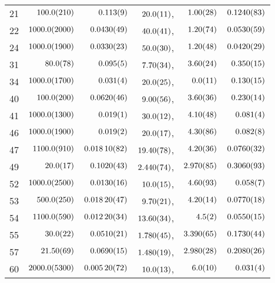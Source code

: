 \begin{tabular}{l|r|r|r|r|r}
21 & $\num{100+-21.0}$ & $\num{0.113+-0.009}$ & $\num{20+-1.1}$, & $\num{1.0+-0.28}$ & $\num{0.124+-0.0083}$ \\
22 & $\num{1000+-200.0}$ & $\num{0.043+-0.0049}$ & $\num{40+-4.1}$, & $\num{1.2+-0.74}$ & $\num{0.053+-0.0059}$ \\
24 & $\num{1000+-190.0}$ & $\num{0.033+-0.0023}$ & $\num{50+-3.0}$, & $\num{1.2+-0.48}$ & $\num{0.042+-0.0029}$ \\
31 & $\num{80+-7.8}$ & $\num{0.095+-0.005}$ & $\num{7.7+-0.34}$, & $\num{3.6+-0.24}$ & $\num{0.35+-0.015}$ \\
34 & $\num{1000+-170.0}$ & $\num{0.031+-0.004}$ & $\num{20+-2.5}$, & $\num{0+-1.1}$ & $\num{0.13+-0.015}$ \\
40 & $\num{100+-20.0}$ & $\num{0.062+-0.0046}$ & $\num{9.0+-0.56}$, & $\num{3.6+-0.36}$ & $\num{0.23+-0.014}$ \\
41 & $\num{1000+-130.0}$ & $\num{0.019+-0.001}$ & $\num{30+-1.2}$, & $\num{4.1+-0.48}$ & $\num{0.081+-0.004}$ \\
46 & $\num{1000+-190.0}$ & $\num{0.019+-0.002}$ & $\num{20+-1.7}$, & $\num{4.3+-0.86}$ & $\num{0.082+-0.008}$ \\
47 & $\num{1100+-91.0}$ & $\num{0.0181+-0.00082}$ & $\num{19.4+-0.78}$, & $\num{4.2+-0.36}$ & $\num{0.076+-0.0032}$ \\
49 & $\num{20+-1.7}$ & $\num{0.102+-0.0043}$ & $\num{2.44+-0.074}$, & $\num{2.97+-0.085}$ & $\num{0.306+-0.0093}$ \\
52 & $\num{1000+-250.0}$ & $\num{0.013+-0.0016}$ & $\num{10+-1.5}$, & $\num{4.6+-0.93}$ & $\num{0.058+-0.007}$ \\
53 & $\num{500+-25.0}$ & $\num{0.0182+-0.00047}$ & $\num{9.7+-0.21}$, & $\num{4.2+-0.14}$ & $\num{0.077+-0.0018}$ \\
54 & $\num{1100+-59.0}$ & $\num{0.0122+-0.00034}$ & $\num{13.6+-0.34}$, & $\num{4.5+-0.2}$ & $\num{0.055+-0.0015}$ \\
55 & $\num{30+-2.2}$ & $\num{0.051+-0.0021}$ & $\num{1.78+-0.045}$, & $\num{3.39+-0.065}$ & $\num{0.173+-0.0044}$ \\
57 & $\num{21.5+-0.69}$ & $\num{0.069+-0.0015}$ & $\num{1.48+-0.019}$, & $\num{2.98+-0.028}$ & $\num{0.208+-0.0026}$ \\
60 & $\num{2000+-530.0}$ & $\num{0.0052+-0.00072}$ & $\num{10+-1.3}$, & $\num{6+-1.0}$ & $\num{0.031+-0.004}$ \\
\end{tabular}
